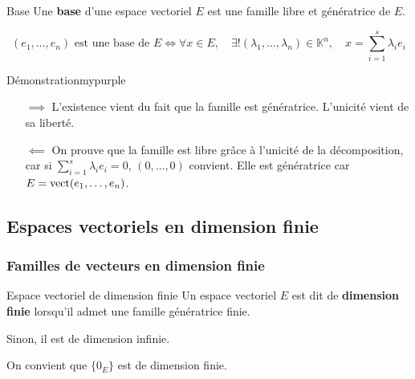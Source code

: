     \begin{defitheo}{Base}{}
        Une \textbf{base} d’une espace vectoriel $E$ est une famille libre et génératrice de $E$.

        \[ (e_1,\ldots,e_n) \text{ est une base de } E \iff \forall x \in E, 
        \quad \exists ! (\lambda_1,\ldots,\lambda_n) \in \mathbb{K}^n, \quad x = \sum\limits_{i=1}^s \lambda_i e_i \]
    \end{defitheo}

    \begin{demo}{Démonstration}{mypurple}
        \begin{itemize}
            \item[$\implies$] L’existence vient du fait que la famille est génératrice. L’unicité vient de sa liberté.
            \item[$\impliedby$] On prouve que la famille est libre grâce à l’unicité de la décomposition, car si $\sum\limits_{i=1}^s \lambda_i e_i = 0$, $(0,\ldots,0)$ convient. Elle est génératrice car $E = \operatorname{vect}(e_1,\ldots,e_n)$.
        \end{itemize}
    \end{demo}

\subsection{Espaces vectoriels en dimension finie}

    \subsubsection{Familles de vecteurs en dimension finie}

    \begin{defi}{Espace vectoriel de dimension finie}{}
        Un espace vectoriel $E$ est dit de \textbf{dimension finie} lorsqu’il admet une famille génératrice finie.

        Sinon, il est de dimension infinie. 

        On convient que $\big\{ 0_E \big\}$ est de dimension finie.
    \end{defi}

